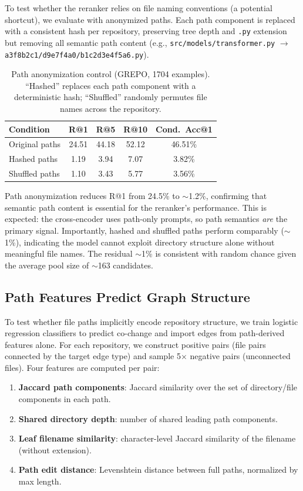 \documentclass{article}
\begin{document}
To test whether the reranker relies on file naming conventions (a potential shortcut), we evaluate with anonymized paths.
Each path component is replaced with a consistent hash per repository, preserving tree depth and \texttt{.py} extension but removing all semantic path content (e.g., \texttt{src/models/transformer.py} $\to$ \texttt{a3f8b2c1/d9e7f4a0/b1c2d3e4f5a6.py}).

\begin{table}[h]
\centering
\small
\caption{Path anonymization control (GREPO, 1704 examples). ``Hashed'' replaces each path component with a deterministic hash; ``Shuffled'' randomly permutes file names across the repository.}
\label{tab:path_anon}
\begin{tabular}{lcccc}
\toprule
\textbf{Condition} & \textbf{R@1} & \textbf{R@5} & \textbf{R@10} & \textbf{Cond.\ Acc@1} \\
\midrule
Original paths & 24.51 & 44.18 & 52.12 & 46.51\% \\
Hashed paths & 1.19 & 3.94 & 7.07 & 3.82\% \\
Shuffled paths & 1.10 & 3.43 & 5.77 & 3.56\% \\
\bottomrule
\end{tabular}
\end{table}

Path anonymization reduces R@1 from 24.5\% to $\sim$1.2\%, confirming that semantic path content is essential for the reranker's performance.
This is expected: the cross-encoder uses path-only prompts, so path semantics \emph{are} the primary signal.
Importantly, hashed and shuffled paths perform comparably ($\sim$1\%), indicating the model cannot exploit directory structure alone without meaningful file names.
The residual $\sim$1\% is consistent with random chance given the average pool size of $\sim$163 candidates.


\subsection{Path Features Predict Graph Structure}
\label{app:path_predicts}

To test whether file paths implicitly encode repository structure, we train logistic regression classifiers to predict co-change and import edges from path-derived features alone.
For each repository, we construct positive pairs (file pairs connected by the target edge type) and sample 5$\times$ negative pairs (unconnected files).
Four features are computed per pair:

\begin{enumerate}
    \item \textbf{Jaccard path components}: Jaccard similarity over the set of directory/file components in each path.
    \item \textbf{Shared directory depth}: number of shared leading path components.
    \item \textbf{Leaf filename similarity}: character-level Jaccard similarity of the filename (without extension).
    \item \textbf{Path edit distance}: Levenshtein distance between full paths, normalized by max length.
\end{enumerate}
\end{document}
